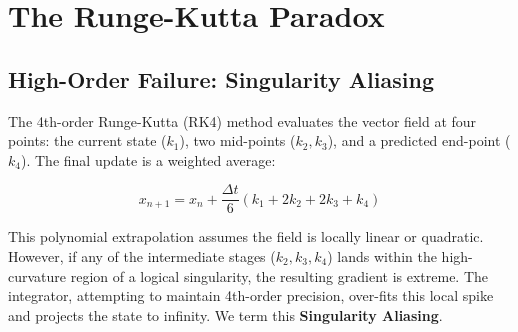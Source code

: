 \documentclass[12pt,a4paper]{article}
\begin{document}
\section{The Runge-Kutta Paradox}

\subsection{High-Order Failure: Singularity Aliasing}

The 4th-order Runge-Kutta (RK4) method evaluates the vector field at four points: the current state ($k_1$), two mid-points ($k_2, k_3$), and a predicted end-point ($k_4$). The final update is a weighted average:

\begin{equation}
x_{n+1} = x_n + \frac{\Delta t}{6}(k_1 + 2k_2 + 2k_3 + k_4)
\end{equation}

This polynomial extrapolation assumes the field is locally linear or quadratic. However, if any of the intermediate stages ($k_2, k_3, k_4$) lands within the high-curvature region of a logical singularity, the resulting gradient is extreme. The integrator, attempting to maintain 4th-order precision, over-fits this local spike and projects the state to infinity. We term this \textbf{Singularity Aliasing}.
\end{document}
